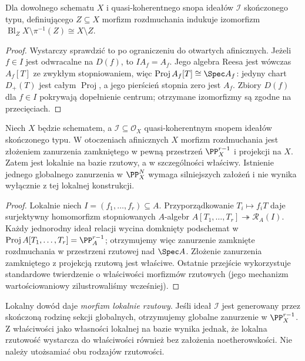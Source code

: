 \begin{stwierdzenie}
\label{st:ga5-off-centre}
Dla dowolnego schematu $X$ i quasi-koherentnego snopa
ideałów $\mathcal I$ skończonego typu, definiującego $Z\subseteq X$
morfizm rozdmuchania indukuje izomorfizm
$\operatorname{Bl}_Z X\setminus\pi^{-1}(Z)\cong X\setminus Z$.
\end{stwierdzenie}
\begin{proof}
Wystarczy sprawdzić to po ograniczeniu do otwartych
afinicznych. Jeżeli $f\in I$ jest odwracalne na $D(f)$,
to $I A_f=A_f$. Jego algebra Reesa jest wówczas
$A_f[T]$ ze zwykłym stopniowaniem, więc
$\operatorname{Proj}A_f[T]\cong\Spec A_f$: jedyny chart
$D_+(T)$ jest całym $\operatorname{Proj}$, a jego
pierścień stopnia zero jest $A_f$. Zbiory $D(f)$
dla $f\in I$ pokrywają dopełnienie centrum; otrzymane
izomorfizmy są zgodne na przecięciach.
\end{proof}

\begin{stwierdzenie}
\label{st:ga5-blowup-proper}
Niech $X$ będzie schematem, a $\mathcal I\subseteq\mathcal O_X$
quasi-koherentnym snopem ideałów skończonego typu.
W otoczeniach afinicznych $X$ morfizm rozdmuchania jest
złożeniem zanurzenia zamkniętego w pewną przestrzeń
$\PP^{r-1}_X$ i projekcji na $X$. Zatem jest lokalnie
na bazie rzutowy, a w szczególności właściwy. Istnienie
jednego globalnego zanurzenia w $\PP^N_X$ wymaga
silniejszych założeń i nie wynika wyłącznie z tej lokalnej
konstrukcji.
\end{stwierdzenie}
\begin{proof}
Lokalnie niech $I=(f_1,\ldots,f_r)\subseteq A$.
Przyporządkowanie $T_i\mapsto f_iT$ daje surjektywny
homomorfizm stopniowanych $A$-algebr
$A[T_1,\ldots,T_r]\twoheadrightarrow\mathcal R_A(I)$.
Każdy jednorodny ideał relacji wycina domknięty
podschemat w $\operatorname{Proj}A[T_1,\ldots,T_r]
=\PP^{r-1}_A$; otrzymujemy więc zanurzenie zamknięte
rozdmuchania w przestrzeni rzutowej nad $\Spec A$.
Złożenie zanurzenia zamkniętego z projekcją rzutową
jest właściwe. Ostatnie przejście wykorzystuje standardowe
twierdzenie o właściwości morfizmów rzutowych (jego
mechanizm wartościowaniowy zilustrowaliśmy wcześniej).
\end{proof}

\begin{uwaga}
Lokalny dowód daje \emph{morfizm lokalnie rzutowy}.
Jeśli ideał $\mathcal I$ jest generowany przez skończoną
rodzinę sekcji globalnych, otrzymujemy globalne zanurzenie
w $\PP^{r-1}_X$. Z właściwości jako własności lokalnej
na bazie wynika jednak, że lokalna rzutowość wystarcza
do właściwości również bez założenia noetherowskości.
Nie należy utożsamiać obu rodzajów rzutowości.
\end{uwaga}

